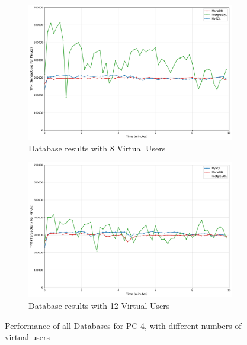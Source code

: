 \begin{figure}[H]
    \hspace*{-1.7cm}
    \begin{subfigure}[b]{0.6\textwidth}
        \centering
        \includegraphics[width=\linewidth]{Images/db_comparison_8_users.png}
        \caption{Database results with 8 Virtual Users}
        \label{fig:db-8vu}
    \end{subfigure}%
    \begin{subfigure}[b]{0.6\textwidth}
        \centering
        \includegraphics[width=\linewidth]{Images/db_comparison_12_users.png}
        \caption{Database results with 12 Virtual Users}
        \label{fig:db-12vu}
    \end{subfigure}

    \caption{Performance of all Databases for PC 4, with different numbers of virtual users}
    \label{fig:final-all}
    
\end{figure}

